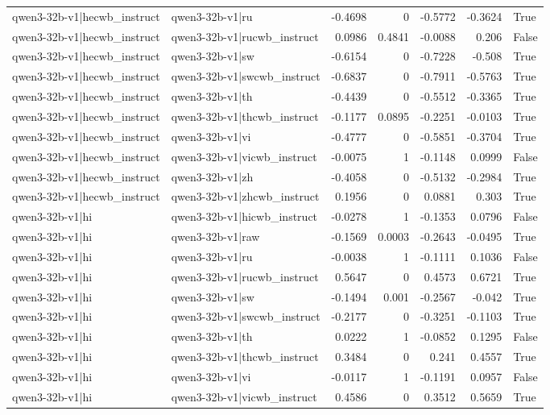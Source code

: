\begin{table}
\begin{tabular}{l l r r r r l}
qwen3-32b-v1|hecwb_instruct & qwen3-32b-v1|ru & -0.4698 & 0 & -0.5772 & -0.3624 & True \\
qwen3-32b-v1|hecwb_instruct & qwen3-32b-v1|rucwb_instruct & 0.0986 & 0.4841 & -0.0088 & 0.206 & False \\
qwen3-32b-v1|hecwb_instruct & qwen3-32b-v1|sw & -0.6154 & 0 & -0.7228 & -0.508 & True \\
qwen3-32b-v1|hecwb_instruct & qwen3-32b-v1|swcwb_instruct & -0.6837 & 0 & -0.7911 & -0.5763 & True \\
qwen3-32b-v1|hecwb_instruct & qwen3-32b-v1|th & -0.4439 & 0 & -0.5512 & -0.3365 & True \\
qwen3-32b-v1|hecwb_instruct & qwen3-32b-v1|thcwb_instruct & -0.1177 & 0.0895 & -0.2251 & -0.0103 & True \\
qwen3-32b-v1|hecwb_instruct & qwen3-32b-v1|vi & -0.4777 & 0 & -0.5851 & -0.3704 & True \\
qwen3-32b-v1|hecwb_instruct & qwen3-32b-v1|vicwb_instruct & -0.0075 & 1 & -0.1148 & 0.0999 & False \\
qwen3-32b-v1|hecwb_instruct & qwen3-32b-v1|zh & -0.4058 & 0 & -0.5132 & -0.2984 & True \\
qwen3-32b-v1|hecwb_instruct & qwen3-32b-v1|zhcwb_instruct & 0.1956 & 0 & 0.0881 & 0.303 & True \\
qwen3-32b-v1|hi & qwen3-32b-v1|hicwb_instruct & -0.0278 & 1 & -0.1353 & 0.0796 & False \\
qwen3-32b-v1|hi & qwen3-32b-v1|raw & -0.1569 & 0.0003 & -0.2643 & -0.0495 & True \\
qwen3-32b-v1|hi & qwen3-32b-v1|ru & -0.0038 & 1 & -0.1111 & 0.1036 & False \\
qwen3-32b-v1|hi & qwen3-32b-v1|rucwb_instruct & 0.5647 & 0 & 0.4573 & 0.6721 & True \\
qwen3-32b-v1|hi & qwen3-32b-v1|sw & -0.1494 & 0.001 & -0.2567 & -0.042 & True \\
qwen3-32b-v1|hi & qwen3-32b-v1|swcwb_instruct & -0.2177 & 0 & -0.3251 & -0.1103 & True \\
qwen3-32b-v1|hi & qwen3-32b-v1|th & 0.0222 & 1 & -0.0852 & 0.1295 & False \\
qwen3-32b-v1|hi & qwen3-32b-v1|thcwb_instruct & 0.3484 & 0 & 0.241 & 0.4557 & True \\
qwen3-32b-v1|hi & qwen3-32b-v1|vi & -0.0117 & 1 & -0.1191 & 0.0957 & False \\
qwen3-32b-v1|hi & qwen3-32b-v1|vicwb_instruct & 0.4586 & 0 & 0.3512 & 0.5659 & True \\

\end{tabular}
\end{table}
